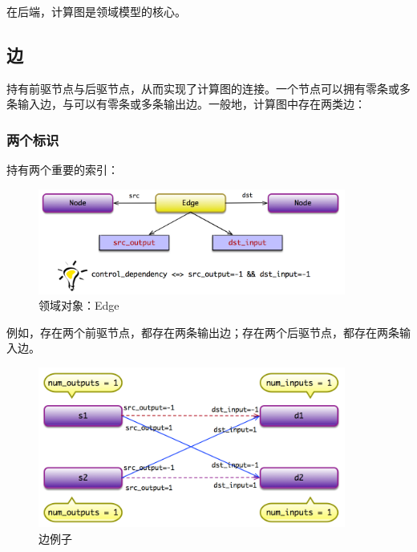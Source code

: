 \begin{content}

在后端，计算图是领域模型的核心。

\subsection{边}

持有前驱节点与后驱节点，从而实现了计算图的连接。一个节点可以拥有零条或多条输入边，与可以有零条或多条输出边。一般地，计算图中存在两类边：

\begin{enum}
\end{enum}

\subsubsection{两个标识}

持有两个重要的索引：

\begin{enum}
\end{enum}


\begin{figure}[H]
\centering
\includegraphics[width=0.9\textwidth]{figures/cc-edge-model.png}
\caption{领域对象：Edge}
 \label{fig:cc-edge-model}
\end{figure}

例如，存在两个前驱节点，都存在两条输出边；存在两个后驱节点，都存在两条输入边。

\begin{figure}[H]
\centering
\includegraphics[width=0.9\textwidth]{figures/cc-edge-model-example.png}
\caption{边例子}
 \label{fig:cc-edge-model-example}
\end{figure}


\end{content}
